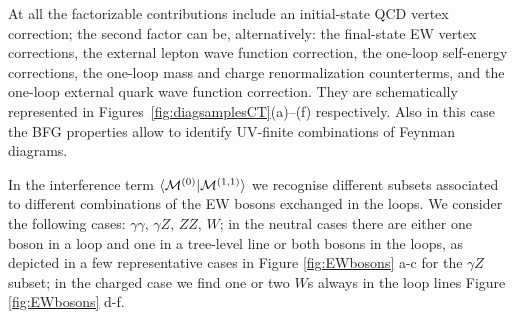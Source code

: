 \documentclass[11pt,a4paper]{article}
\begin{document}
%
%
At \oaas all the factorizable contributions include an initial-state QCD vertex correction;
the second factor can be, alternatively:
the final-state EW vertex corrections,
the external lepton wave function correction,
the one-loop self-energy corrections,
the one-loop mass and charge renormalization counterterms, and
the one-loop external quark wave function correction.
They are schematically represented in
Figures~\ref{fig:diagsamplesCT}(a)--(f) respectively.
Also in this case the BFG properties allow to identify UV-finite combinations of Feynman diagrams.
%

In the interference term  $\langle {\cal M}^{(0)} | {\cal M}^{(1,1)} \rangle$
we recognise different subsets associated to different combinations of the EW bosons exchanged in the loops.
We consider the following cases: $\gamma\gamma,\,\gamma Z,\,ZZ,\,W$;
in the neutral cases there are either one boson in a loop and one in a tree-level line
or both bosons in the loops, as depicted in a few representative cases
in Figure \ref{fig:EWbosons} a-c for the $\gamma Z$ subset;
in the charged case we find one or two $W$s always in the loop lines
Figure \ref{fig:EWbosons} d-f.
\end{document}
